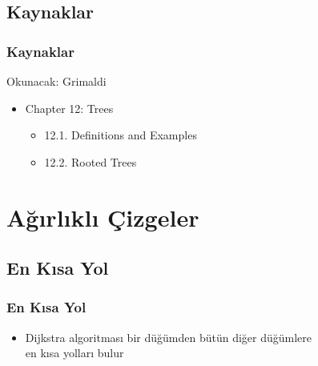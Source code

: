 \documentclass[dvipsnames]{beamer}
\theoremstyle{definition}
\theoremstyle{example}
\theoremstyle{plain}
\begin{document}
\subsection*{Kaynaklar}

\begin{frame}
  \frametitle{Kaynaklar}

  \begin{block}{Okunacak: Grimaldi}
    \begin{itemize}
      \item Chapter 12: Trees
      \begin{itemize}
        \item 12.1. \alert{Definitions and Examples}
        \item 12.2. \alert{Rooted Trees}
      \end{itemize}
    \end{itemize}
  \end{block}
\end{frame}

\section{Ağırlıklı Çizgeler}

\subsection{En Kısa Yol}

\begin{frame}
  \frametitle{En Kısa Yol}

  \begin{itemize}
    \item Dijkstra algoritması bir düğümden bütün diğer düğümlere\\
      en kısa yolları bulur
  \end{itemize}
\end{frame}
\end{document}

